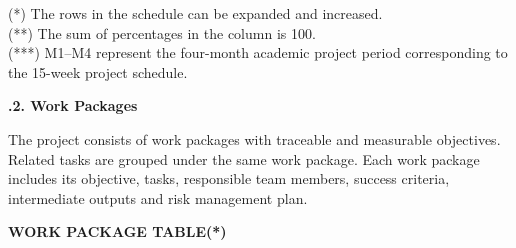 \documentclass[10pt,a4paper]{article}
\newcommand{\subhead}[1]{\vspace{0.8em}\noindent\textbf{\fontsize{10}{11}\selectfont #1}\par\vspace{0.3em}}
\begin{document}
{\footnotesize
(*) The rows in the schedule can be expanded and increased. \\
(**) The sum of percentages in the column is 100. \\
(***) M1--M4 represent the four-month academic project period corresponding to the 15-week project schedule.
}
\normalsize

\subhead{3.1.2. Work Packages}

The project consists of work packages with traceable and measurable objectives. Related tasks are grouped under the same work package. Each work package includes its objective, tasks, responsible team members, success criteria, intermediate outputs and risk management plan.

\begin{center}\textbf{WORK PACKAGE TABLE(*)}\end{center}
\scriptsize
\end{document}
